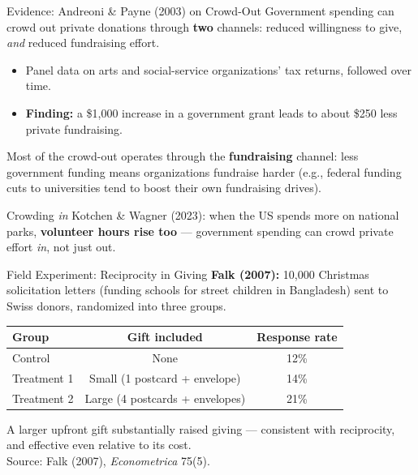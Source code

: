 \documentclass[11pt,aspectratio=169]{beamer}
\newcommand{\srcnote}[1]{{\footnotesize\color{wugray}Source: #1}}
\begin{document}
\begin{frame}{Evidence: Andreoni \& Payne (2003) on Crowd-Out}
  Government spending can crowd out private donations through \textbf{two} channels: reduced willingness to give, \emph{and} reduced fundraising effort.
  \begin{itemize}
    \item Panel data on arts and social-service organizations' tax returns, followed over time.
    \item \textbf{Finding:} a \$1{,}000 increase in a government grant leads to about \$250 less private fundraising.
  \end{itemize}
  \small Most of the crowd-out operates through the \textbf{fundraising} channel: less government funding means organizations fundraise harder (e.g., federal funding cuts to universities tend to boost their own fundraising drives).
  \vspace{0.4em}
  \begin{alertblock}{Crowding \emph{in}}
    Kotchen \& Wagner (2023): when the US spends more on national parks, \textbf{volunteer hours rise too} --- government spending can crowd private effort \emph{in}, not just out.
  \end{alertblock}
\end{frame}

\begin{frame}{Field Experiment: Reciprocity in Giving}
  \textbf{Falk (2007):} 10{,}000 Christmas solicitation letters (funding schools for street children in Bangladesh) sent to Swiss donors, randomized into three groups.
  \begin{center}
  \begin{tabular}{@{}lcc@{}}
    \toprule
    \textbf{Group} & \textbf{Gift included} & \textbf{Response rate} \\
    \midrule
    Control & None & 12\% \\
    Treatment 1 & Small (1 postcard + envelope) & 14\% \\
    Treatment 2 & Large (4 postcards + envelopes) & 21\% \\
    \bottomrule
  \end{tabular}
  \end{center}
  \vspace{0.4em}
  \small A larger upfront gift substantially raised giving --- consistent with reciprocity, and effective even relative to its cost.\\
  \srcnote{Falk (2007), \emph{Econometrica} 75(5).}
\end{frame}
\end{document}
